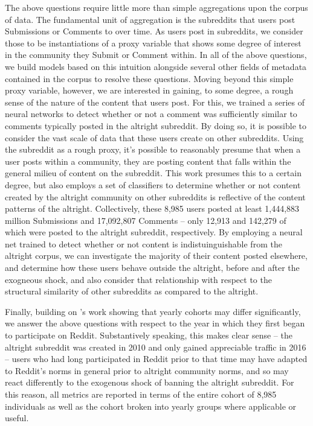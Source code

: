 \documentclass[letterpaper,12pt]{article}
\begin{document}
The above questions require little more than simple aggregations upon the corpus of data. The fundamental unit of aggregation is the subreddits that users post Submissions or Comments to over time. As users post in subreddits, we consider those to be instantiations of a proxy variable that shows some degree of interest in the community they Submit or Comment within. In all of the above questions, we build models based on this intuition alongside several other fields of metadata contained in the corpus to resolve these questions. Moving beyond this simple proxy variable, however, we are interested in gaining, to some degree, a rough sense of the nature of the content that users post. For this, we trained a series of neural networks to detect whether or not a comment was sufficiently similar to comments typically posted in the altright subreddit. By doing so, it is possible to consider the vast scale of data that these users create on other subreddits. Using the subreddit as a rough proxy, it's possible to reasonably presume that when a user posts within a community, they are posting content that falls within the general milieu of content on the subreddit. This work presumes this to a certain degree, but also employs a set of classifiers to determine whether or not content created by the altright community on other subreddits is reflective of the content patterns of the altright. Collectively, these 8,985 users posted at least 1,444,883 million Submissions and 17,092,807 Comments -- only 12,913 and 142,279 of which were posted to the altright subreddit, respectively. By employing a neural net trained to detect whether or not content is indistuinguishable from the altright corpus, we can investigate the majority of their content posted elsewhere, and determine how these users behave outside the altright, before and after the exogneous shock, and also consider that relationship with respect to the structural similarity of other subreddits as compared to the altright.

Finally, building on \cite{barbosa2016averaging}'s work showing that yearly cohorts may differ significantly, we answer the above questions with respect to the year in which they first began to participate on Reddit. Substantively speaking, this makes clear sense -- the altright subreddit was created in 2010 and only gained appreciable traffic in 2016 -- users who had long participated in Reddit prior to that time may have adapted to Reddit's norms in general prior to altright community norms, and so may react differently to the exogenous shock of banning the altright subreddit. For this reason, all metrics are reported in terms of the entire cohort of 8,985 individuals as well as the cohort broken into yearly groups where applicable or useful.
\end{document}

